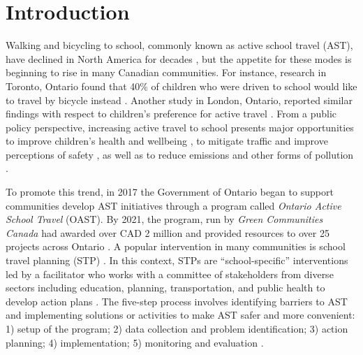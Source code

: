 \documentclass[preprint, 3p,
authoryear]{elsarticle} %
\begin{document}
\begin{frontmatter}
 \end{frontmatter}

\newpage

\hypertarget{introduction}{%
\section{Introduction}\label{introduction}}

Walking and bicycling to school, commonly known as active school travel
(AST), have declined in North America for decades
\citep{rothmanDeclineActiveSchool2018}, but the appetite for these modes
is beginning to rise in many Canadian communities. For instance,
research in Toronto, Ontario found that 40\% of children who were driven
to school would like to travel by bicycle instead
\citep{laroucheRatherBikeSchool2016}. Another study in London, Ontario,
reported similar findings with respect to children's preference for
active travel \citep{larsenRouteBasedAnalysisCapture2012}. From a public
policy perspective, increasing active travel to school presents major
opportunities to improve children's health and wellbeing
\citep{faulknerActiveSchoolTransport2009}, to mitigate traffic and
improve perceptions of safety
\citep{rothmanAssociationsParentsPerception2015}, as well as to reduce
emissions and other forms of pollution
\citep{bearman2014modelling, goodman2019scenarios}.

To promote this trend, in 2017 the Government of Ontario began to
support communities develop AST initiatives through a program called
\emph{Ontario Active School Travel} (OAST). By 2021, the program, run by
\emph{Green Communities Canada} had awarded over CAD 2 million and
provided resources to over 25 projects across Ontario
\citep{GreenCommunities2016}. A popular intervention in many communities
is school travel planning (STP) \citep[see][]{GreenCommunitiesProjects}.
In this context, STPs are ``school-specific'' interventions led by a
facilitator who works with a committee of stakeholders from diverse
sectors including education, planning, transportation, and public health
to develop action plans
\citep{buliungSchoolTravelPlanning2011, mammenSchoolTravelPlanning2014}.
The five-step process involves identifying barriers to AST and
implementing solutions or activities to make AST safer and more
convenient: 1) setup of the program; 2) data collection and problem
identification; 3) action planning; 4) implementation; 5) monitoring and
evaluation \citep{hinckson2018school}.
\end{document}
